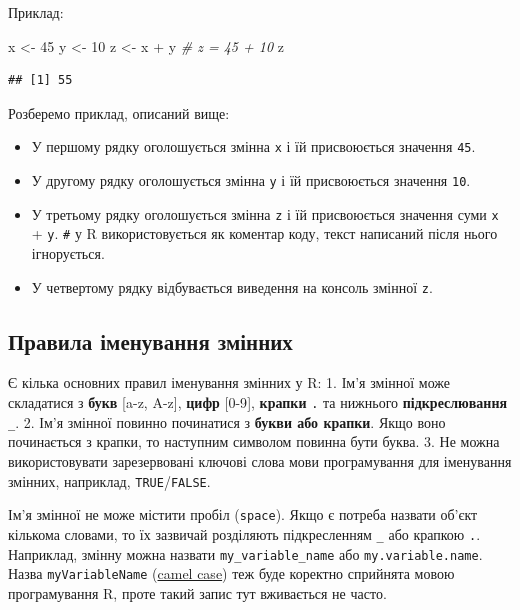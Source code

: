 \documentclass[
]{book}
\newenvironment{Shaded}{\begin{snugshade}}{\end{snugshade}}
\newcommand{\CommentTok}[1]{\textcolor[rgb]{0.56,0.35,0.01}{\textit{#1}}}
\newcommand{\DecValTok}[1]{\textcolor[rgb]{0.00,0.00,0.81}{#1}}
\newcommand{\NormalTok}[1]{#1}
\newcommand{\OtherTok}[1]{\textcolor[rgb]{0.56,0.35,0.01}{#1}}
\newcommand{\SpecialCharTok}[1]{\textcolor[rgb]{0.00,0.00,0.00}{#1}}
\providecommand{\tightlist}{%
  \setlength{\itemsep}{0pt}\setlength{\parskip}{0pt}}
\begin{document}
Приклад:

\begin{Shaded}
\begin{Highlighting}[]
\NormalTok{x }\OtherTok{\textless{}{-}} \DecValTok{45}
\NormalTok{y }\OtherTok{\textless{}{-}} \DecValTok{10}
\NormalTok{z }\OtherTok{\textless{}{-}}\NormalTok{ x }\SpecialCharTok{+}\NormalTok{ y }\CommentTok{\# z = 45 + 10}
\NormalTok{z}
\end{Highlighting}
\end{Shaded}

\begin{verbatim}
## [1] 55
\end{verbatim}

Розберемо приклад, описаний вище:

\begin{itemize}
\tightlist
\item
  У першому рядку оголошується змінна \texttt{x} і їй присвоюється значення \texttt{45}.
\item
  У другому рядку оголошується змінна \texttt{y} і їй присвоюється значення \texttt{10}.
\item
  У третьому рядку оголошується змінна \texttt{z} і їй присвоюється значення суми \texttt{x} + \texttt{y}.
  \texttt{\#} у R використовується як коментар коду, текст написаний після нього ігнорується.
\item
  У четвертому рядку відбувається виведення на консоль змінної \texttt{z}.
\end{itemize}

\hypertarget{chapter212}{%
\subsection{Правила іменування змінних}\label{chapter212}}

Є кілька основних правил іменування змінних у R:
1. Ім'я змінної може складатися з \textbf{букв} {[}a-z, A-z{]}, \textbf{цифр} {[}0-9{]}, \textbf{крапки} \texttt{.} та нижнього \textbf{підкреслювання} \texttt{\_}.
2. Ім'я змінної повинно починатися з \textbf{букви або крапки}. Якщо воно починається з крапки, то наступним символом повинна бути буква.
3. Не можна використовувати зарезервовані ключові слова мови програмування для іменування змінних, наприклад, \texttt{TRUE}/\texttt{FALSE}.

Ім'я змінної не може містити пробіл (\texttt{space}). Якщо є потреба назвати об'єкт кількома словами, то їх зазвичай розділяють підкресленням \texttt{\_} або крапкою \texttt{.}. Наприклад, змінну можна назвати \texttt{my\_variable\_name} або \texttt{my.variable.name}. Назва \texttt{myVariableName} (\href{https://en.wikipedia.org/wiki/Camel_case}{camel case}) теж буде коректно сприйнята мовою програмування R, проте такий запис тут вживається не часто.
\end{document}
